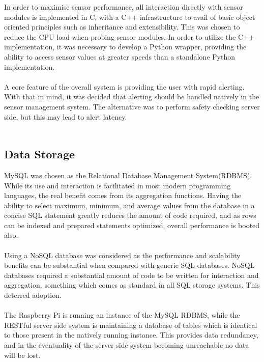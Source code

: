 \documentclass{article}
\begin{document}
In order to maximise sensor performance, all interaction directly with sensor modules is implemented in C, with a C++ infrastructure to avail of basic object oriented principles such as inheritance and extensibility. This was chosen to reduce the CPU load when probing sensor modules. In order to utilize the C++ implementation, it was necessary to develop a Python wrapper, providing the ability to access sensor values at greater speeds than a standalone Python implementation. \\\\
A core feature of the overall system is providing the user with rapid alerting. With that in mind, it was decided that alerting should be handled natively in the sensor management system. The alternative was to perform safety checking server side, but this may lead to alert latency. \\\\
\subsection{Data Storage}
MySQL was chosen as the Relational Database Management System(RDBMS). While its use and interaction is facilitated in most modern programming languages, the real benefit comes from its aggregation functions. Having the ability to select maximum, minimum, and average values from the database in a concise SQL statement greatly reduces the amount of code required, and as rows can be indexed and prepared statements optimized, overall performance is booted also. \\\\
Using a NoSQL database was considered as the performance and scalability benefits can be substantial when compared with generic SQL databases. NoSQL databases required a substantial amount of code to be written for interaction and aggregation, something which comes as standard in all SQL storage systems. This deterred adoption. \\\\
The Raspberry Pi is running an instance of the MySQL RDBMS, while the RESTful server side system is maintaining a database of tables which is identical to those present in the natively running instance. This provides data redundancy, and in the eventuality of the server side system becoming unreachable no data will be lost. \\\\
\end{document}

